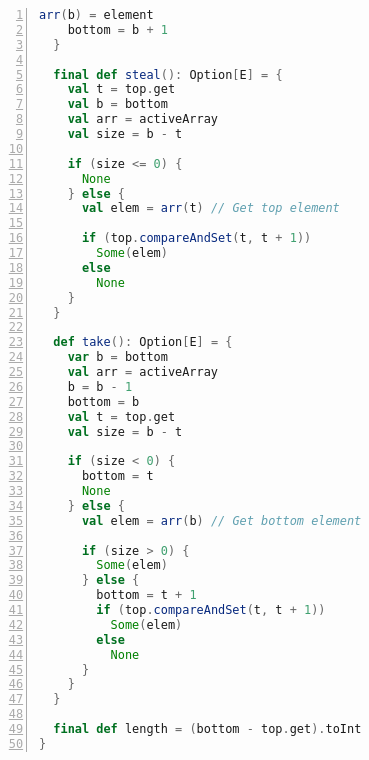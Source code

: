 \begin{lstlisting}[language=scala,basicstyle=\ttfamily\bfseries\scriptsize,numbers=left]
    arr(b) = element
    bottom = b + 1
  }

  final def steal(): Option[E] = {
    val t = top.get
    val b = bottom
    val arr = activeArray
    val size = b - t

    if (size <= 0) {
      None
    } else {
      val elem = arr(t) // Get top element

      if (top.compareAndSet(t, t + 1)) 
        Some(elem)
      else 
        None
    }
  }

  def take(): Option[E] = {
    var b = bottom
    val arr = activeArray
    b = b - 1
    bottom = b
    val t = top.get
    val size = b - t

    if (size < 0) {
      bottom = t
      None
    } else {
      val elem = arr(b) // Get bottom element

      if (size > 0) {
        Some(elem)
      } else {
        bottom = t + 1
        if (top.compareAndSet(t, t + 1)) 
          Some(elem) 
        else
          None
      }
    }
  }

  final def length = (bottom - top.get).toInt
}
\end{lstlisting}

